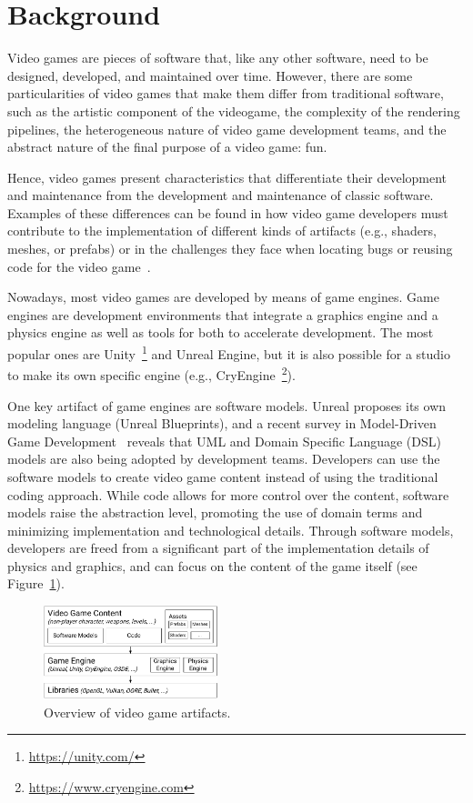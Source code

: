 \section{Background} \label{sec:Background}

Video games are pieces of software that, like any other software, need to be designed, developed, and maintained over time. However, there are some particularities of video games that make them differ from traditional software, such as the artistic component of the videogame, the complexity of the rendering pipelines, the heterogeneous nature of video game development teams, and the abstract nature of the final purpose of a video game: fun. 

Hence, video games present characteristics that differentiate their development and maintenance from the development and maintenance of classic software. Examples of these differences can be found in how video game developers must contribute to the implementation of different kinds of artifacts (e.g., shaders, meshes, or prefabs) or in the challenges they face when locating bugs or reusing code for the video game~\cite{pascarella2018video, chueca2023consolidation}.

Nowadays, most video games are developed by means of game engines. Game engines are development environments that integrate a graphics engine and a physics engine as well as tools for both to accelerate development. The most popular ones are Unity~\footnote{\url{https://unity.com/}} and Unreal Engine, but it is also possible for a studio to make its own specific engine (e.g., CryEngine~\footnote{\url{https://www.cryengine.com}}). 

One key artifact of game engines are software models. Unreal proposes its own modeling language (Unreal Blueprints), and a recent survey in Model-Driven Game Development~\cite{zhu2019model} reveals that UML and Domain Specific Language (DSL) models are also being adopted by development teams. Developers can use the software models to create video game content instead of using the traditional coding approach. While code allows for more control over the content, software models raise the abstraction level, promoting the use of domain terms and minimizing implementation and technological details. Through software models, developers are freed from a significant part of the implementation details of physics and graphics, and can focus on the content of the game itself (see Figure~\ref{fig:architecture}).

\begin{figure}[h]
    \centering
    \includegraphics[width=0.45\textwidth]{Figures/fig_bg_OverviewArtifactsVG.pdf}
    \caption{Overview of video game artifacts.}
    \label{fig:architecture}
\end{figure}

